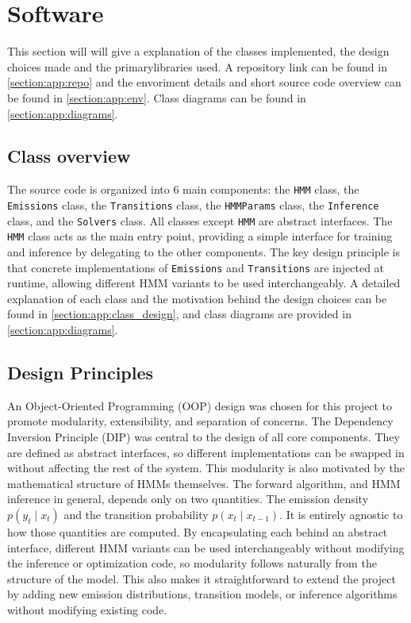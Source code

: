 \section{Software}
This section will will give a explanation of the classes implemented, the design choices made and the primarylibraries used.
A repository link can be found in \ref{section:app:repo} and the envoriment details and short source code overview can be found in \ref{section:app:env}.
Class diagrams can be found in \ref{section:app:diagrams}.
\subsection{Class overview}
The source code is organized into 6 main components: the \texttt{HMM} class, the \texttt{Emissions} class, the \texttt{Transitions} class, the \texttt{HMMParams} class, the \texttt{Inference} class, and the \texttt{Solvers} class.
All classes except \texttt{HMM} are abstract interfaces.
The \texttt{HMM} class acts as the main entry point, providing a simple interface for training and inference by delegating to the other components.
The key design principle is that concrete implementations of \texttt{Emissions} and \texttt{Transitions} are injected at runtime, allowing different HMM variants to be used interchangeably.
A detailed explanation of each class and the motivation behind the design choices can be found in \ref{section:app:class_design}, and class diagrams are provided in \ref{section:app:diagrams}.


\subsection{Design Principles}
An Object-Oriented Programming (OOP) design was chosen for this project to promote modularity, extensibility, and separation of concerns.
The Dependency Inversion Principle (DIP) was central to the design of all core components. They are defined as abstract interfaces, so different implementations can be swapped in without affecting the rest of the system.
This modularity is also motivated by the mathematical structure of HMMs themselves.
The forward algorithm, and HMM inference in general, depends only on two quantities. The emission density $p(y_t \mid x_t)$ and the transition probability $p(x_t \mid x_{t-1})$.
It is entirely agnostic to how those quantities are computed.
By encapsulating each behind an abstract interface, different HMM variants can be used interchangeably without modifying the inference or optimization code, so modularity follows naturally from the structure of the model.
This also makes it straightforward to extend the project by adding new emission distributions, transition models, or inference algorithms without modifying existing code.\newline
